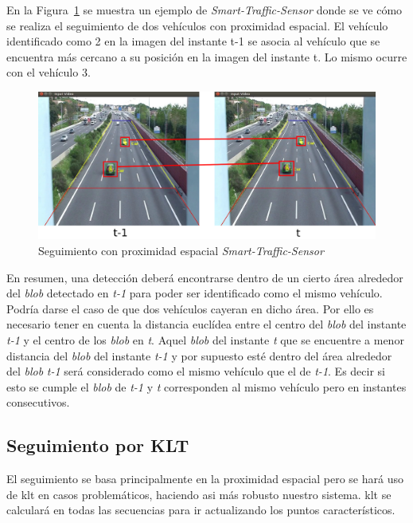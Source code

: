 En la Figura~\ref{fig.proximidad_espacial} se muestra un ejemplo de \textit{Smart-Traffic-Sensor} donde se ve cómo se realiza el seguimiento de dos vehículos con proximidad espacial. El vehículo identificado como 2 en la imagen del instante t-1 se asocia al vehículo que se encuentra más cercano a su posición en la imagen del instante t. Lo mismo ocurre con el vehículo 3.

 \begin{figure}[H] 
\begin{center}
   \includegraphics[scale=0.3]{figures/Diseno_global/proximidad_espacial.png}
   \caption{Seguimiento con proximidad espacial \textit{Smart-Traffic-Sensor}}
	\label{fig.proximidad_espacial}
\end{center}
\end{figure}

En resumen, una detección deberá encontrarse dentro de un cierto área alrededor del \textit{blob} detectado en \textit{t-1} para poder ser identificado como el mismo vehículo. Podría darse el caso de que dos vehículos cayeran en dicho área. Por ello es necesario tener en cuenta la distancia euclídea entre el centro del \textit{blob} del instante \textit{t-1} y el centro de los \textit{blob} en \textit{t}. Aquel \textit{blob} del instante \textit{t} que se encuentre a menor distancia del \textit{blob} del instante \textit{t-1} y por supuesto esté dentro del área alrededor del \textit{blob} \textit{t-1} será considerado como el mismo vehículo que el de \textit{t-1}. Es decir si esto se cumple el \textit{blob} de \textit{t-1} y \textit{t} corresponden al  mismo vehículo pero en instantes consecutivos.

\subsection{Seguimiento por KLT}

El seguimiento se basa principalmente en la proximidad espacial pero se hará uso de \acrshort{klt} en casos problemáticos, haciendo asi más robusto nuestro sistema. \acrshort{klt} se calculará en todas las secuencias para ir actualizando los puntos característicos.

